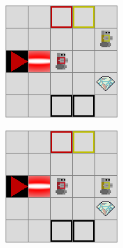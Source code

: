 \begin{figure}[t]
    \centering
    \begin{subfigure}[b]{0.24\textwidth}
         \includegraphics[width=\linewidth]{images/step_2.png}
         \caption{}
         \label{fig:step2-blocking}
    \end{subfigure}
    \begin{subfigure}[b]{0.24\textwidth}
         \includegraphics[width=\linewidth]{images/step_3.png}

\end{subfigure}
\end{figure}
